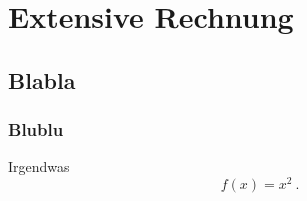 
\chapter{Extensive Rechnung}
\label{app_er}


\section{Blabla}


\subsection{Blublu}

Irgendwas
\begin{equation}
	f(x) = x^2 \ .
	\label{app_er_quatsch}
\end{equation}
